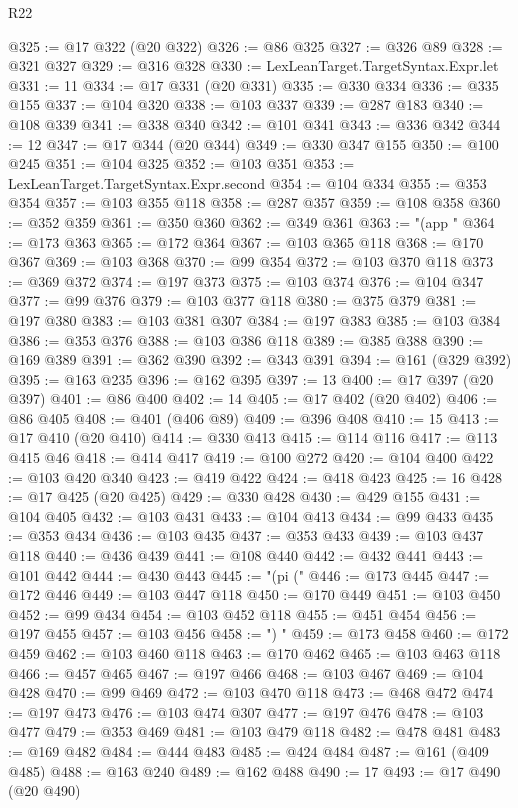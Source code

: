 \begin{lexlean}{R22}
\begin{coremodule}
{{{{{{{{{{{{{{{{{{{{{{{{{{{{{{{{{{{{{{{{{{{{{{{{{{{{@325 := @17 @322 (@20 @322)
@326 := @86 @325
@327 := @326 @89
@328 := @321 @327
@329 := @316 @328
@330 := LexLeanTarget.TargetSyntax.Expr.let
@331 := 11
@334 := @17 @331 (@20 @331)
@335 := @330 @334
@336 := @335 @155
@337 := @104 @320
@338 := @103 @337
@339 := @287 @183
@340 := @108 @339
@341 := @338 @340
@342 := @101 @341
@343 := @336 @342
@344 := 12
@347 := @17 @344 (@20 @344)
@349 := @330 @347 @155
@350 := @100 @245
@351 := @104 @325
@352 := @103 @351
@353 := LexLeanTarget.TargetSyntax.Expr.second
@354 := @104 @334
@355 := @353 @354
@357 := @103 @355 @118
@358 := @287 @357
@359 := @108 @358
@360 := @352 @359
@361 := @350 @360
@362 := @349 @361
@363 := "(app "
@364 := @173 @363
@365 := @172 @364
@367 := @103 @365 @118
@368 := @170 @367
@369 := @103 @368
@370 := @99 @354
@372 := @103 @370 @118
@373 := @369 @372
@374 := @197 @373
@375 := @103 @374
@376 := @104 @347
@377 := @99 @376
@379 := @103 @377 @118
@380 := @375 @379
@381 := @197 @380
@383 := @103 @381 @307
@384 := @197 @383
@385 := @103 @384
@386 := @353 @376
@388 := @103 @386 @118
@389 := @385 @388
@390 := @169 @389
@391 := @362 @390
@392 := @343 @391
@394 := @161 (@329 @392)
@395 := @163 @235
@396 := @162 @395
@397 := 13
@400 := @17 @397 (@20 @397)
@401 := @86 @400
@402 := 14
@405 := @17 @402 (@20 @402)
@406 := @86 @405
@408 := @401 (@406 @89)
@409 := @396 @408
@410 := 15
@413 := @17 @410 (@20 @410)
@414 := @330 @413
@415 := @114 @116
@417 := @113 @415 @46
@418 := @414 @417
@419 := @100 @272
@420 := @104 @400
@422 := @103 @420 @340
@423 := @419 @422
@424 := @418 @423
@425 := 16
@428 := @17 @425 (@20 @425)
@429 := @330 @428
@430 := @429 @155
@431 := @104 @405
@432 := @103 @431
@433 := @104 @413
@434 := @99 @433
@435 := @353 @434
@436 := @103 @435
@437 := @353 @433
@439 := @103 @437 @118
@440 := @436 @439
@441 := @108 @440
@442 := @432 @441
@443 := @101 @442
@444 := @430 @443
@445 := "(pi ("
@446 := @173 @445
@447 := @172 @446
@449 := @103 @447 @118
@450 := @170 @449
@451 := @103 @450
@452 := @99 @434
@454 := @103 @452 @118
@455 := @451 @454
@456 := @197 @455
@457 := @103 @456
@458 := ") "
@459 := @173 @458
@460 := @172 @459
@462 := @103 @460 @118
@463 := @170 @462
@465 := @103 @463 @118
@466 := @457 @465
@467 := @197 @466
@468 := @103 @467
@469 := @104 @428
@470 := @99 @469
@472 := @103 @470 @118
@473 := @468 @472
@474 := @197 @473
@476 := @103 @474 @307
@477 := @197 @476
@478 := @103 @477
@479 := @353 @469
@481 := @103 @479 @118
@482 := @478 @481
@483 := @169 @482
@484 := @444 @483
@485 := @424 @484
@487 := @161 (@409 @485)
@488 := @163 @240
@489 := @162 @488
@490 := 17
@493 := @17 @490 (@20 @490)
}}}}}}}}}}}}}}}}}}}}}}}}}}}}}}}}}}}}}}}}}}}}}}}}}}}}
\end{coremodule}
\end{lexlean}
